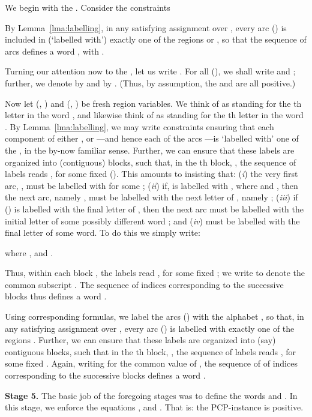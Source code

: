 \documentclass{article}
\begin{document}
We begin with the . Consider the constraints

By Lemma~\ref{lma:labelling}, in any satisfying assignment over
, every arc  () is included in
(`labelled with') exactly one of the regions  or , so that
the sequence of arcs  defines a word , with .

Turning our attention now to the , let us write . For all  (), we
shall write  and ;
further, we denote  by  and  by
. (Thus, by assumption, the  and  are all
positive.)

Now let  (, ) and
 (, ) be fresh
region variables.  We think of  as standing for the th
letter in the word , and likewise think of  as
standing for the th letter in the word .  By
Lemma~\ref{lma:labelling}, we may write constraints ensuring that each
component of either ,  or ---and hence each of the arcs
---is `labelled with' one of the ,
in the by-now familiar sense.  Further, we can ensure that these
labels are organized into (contiguous) blocks, 
such that, in the th block, , the sequence of labels reads
, for some fixed  ().  This amounts to insisting that: ({\em i}) the very first arc,
, must be labelled with  for some ; ({\em ii})
if,  is labelled with , where  and , then the next arc, namely , must be labelled with
the next letter of , namely ; ({\em iii}) if
 () is labelled with the final letter of , then
the next arc must be labelled with the initial letter of some possibly
different word ; and ({\em iv})  must be
labelled with the final letter of some word. To do this we simply
write:

where ,  and .

Thus, within each block , the labels read , for some fixed ; we write  to denote the
common subscript .  The sequence of indices 
corresponding to the successive blocks thus defines a word .

Using corresponding formulas, we label the arcs  () with the alphabet , so that, in any satisfying assignment over
, every arc  () is labelled with
exactly one of the regions . Further, we can ensure that
these labels are organized into (say)  contiguous blocks,  such that in the th block, , the sequence of
labels reads , for some fixed
. Again, writing  for the common value of , the sequence
of of indices  corresponding to the successive
blocks defines a word .


\bigskip

\noindent
\textbf{Stage 5.}  The basic job of the foregoing stages was to define
the words  and .  In this
stage, we enforce the equations ,  and . That is: the PCP-instance  is positive.
\end{document}
